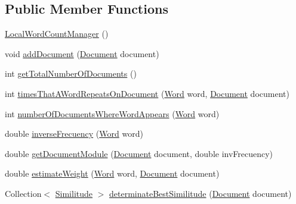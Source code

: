 \subsection*{\-Public \-Member \-Functions}
\begin{DoxyCompactItemize}
\item 
\hyperlink{classcom_1_1utn_1_1searchengine_1_1_local_word_count_manager_ae7395f3b7b0700967981f31647d97f29}{\-Local\-Word\-Count\-Manager} ()
\item 
void \hyperlink{classcom_1_1utn_1_1searchengine_1_1_local_word_count_manager_a7fdb486e1b5ae7581eb27fa139432d61}{add\-Document} (\hyperlink{classcom_1_1utn_1_1searchengine_1_1_document}{\-Document} document)
\item 
int \hyperlink{classcom_1_1utn_1_1searchengine_1_1_local_word_count_manager_a4baf4121a603c1471bcc9e0856844bae}{get\-Total\-Number\-Of\-Documents} ()
\item 
int \hyperlink{classcom_1_1utn_1_1searchengine_1_1_local_word_count_manager_acde1570f752717dfe74eb14e8ad682c7}{times\-That\-A\-Word\-Repeats\-On\-Document} (\hyperlink{classcom_1_1utn_1_1searchengine_1_1_word}{\-Word} word, \hyperlink{classcom_1_1utn_1_1searchengine_1_1_document}{\-Document} document)
\item 
int \hyperlink{classcom_1_1utn_1_1searchengine_1_1_local_word_count_manager_aad7261a1c223513a9126656550fd7d12}{number\-Of\-Documents\-Where\-Word\-Appears} (\hyperlink{classcom_1_1utn_1_1searchengine_1_1_word}{\-Word} word)
\item 
double \hyperlink{classcom_1_1utn_1_1searchengine_1_1_local_word_count_manager_acd1c0280284cab09e9c1aca3686d9545}{inverse\-Frecuency} (\hyperlink{classcom_1_1utn_1_1searchengine_1_1_word}{\-Word} word)
\item 
double \hyperlink{classcom_1_1utn_1_1searchengine_1_1_local_word_count_manager_a46f22d947651c786498ae8f93a7ccb61}{get\-Document\-Module} (\hyperlink{classcom_1_1utn_1_1searchengine_1_1_document}{\-Document} document, double inv\-Frecuency)
\item 
double \hyperlink{classcom_1_1utn_1_1searchengine_1_1_local_word_count_manager_a6e756855cacf68cbc81edd8ee6876461}{estimate\-Weight} (\hyperlink{classcom_1_1utn_1_1searchengine_1_1_word}{\-Word} word, \hyperlink{classcom_1_1utn_1_1searchengine_1_1_document}{\-Document} document)
\item 
\-Collection$<$ \hyperlink{classcom_1_1utn_1_1searchengine_1_1_similitude}{\-Similitude} $>$ \hyperlink{classcom_1_1utn_1_1searchengine_1_1_local_word_count_manager_adbea00f02f037e78ff02a412d876ea5c}{determinate\-Best\-Similitude} (\hyperlink{classcom_1_1utn_1_1searchengine_1_1_document}{\-Document} document)

\end{DoxyCompactItemize}

